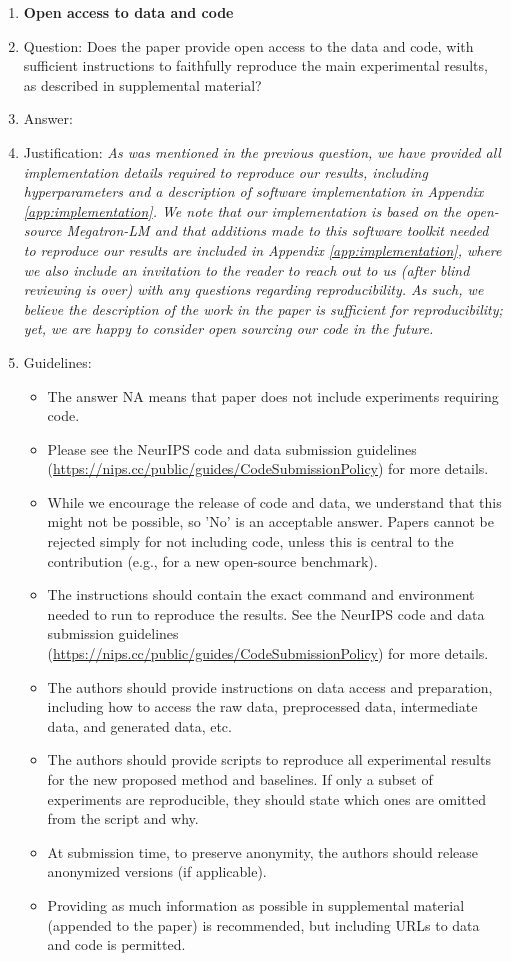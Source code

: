 \documentclass{article}
\theoremstyle{plain}
\begin{document}
\begin{enumerate}
\item {\bf Open access to data and code}
    \item[] Question: Does the paper provide open access to the data and code, with sufficient instructions to faithfully reproduce the main experimental results, as described in supplemental material?
    \item[] Answer: \answerNo %
    \item[] Justification: \textit{As was mentioned in the previous question, we have provided all implementation details required to reproduce our results, including hyperparameters and a description of software implementation in Appendix \ref{app:implementation}. We note that our implementation is based on the open-source Megatron-LM \cite{shoeybi2020megatronlm} and that additions made to this software toolkit needed to reproduce our results are included in Appendix \ref{app:implementation}, where we also include an invitation to the reader to reach out to us (after blind reviewing is over) with any questions regarding reproducibility. As such, we believe the description of the work in the paper is sufficient for reproducibility; yet, we are happy to consider open sourcing our code in the future.}
    \item[] Guidelines:
    \begin{itemize}
        \item The answer NA means that paper does not include experiments requiring code.
        \item Please see the NeurIPS code and data submission guidelines (\url{https://nips.cc/public/guides/CodeSubmissionPolicy}) for more details.
        \item While we encourage the release of code and data, we understand that this might not be possible, so 'No' is an acceptable answer. Papers cannot be rejected simply for not including code, unless this is central to the contribution (e.g., for a new open-source benchmark).
        \item The instructions should contain the exact command and environment needed to run to reproduce the results. See the NeurIPS code and data submission guidelines (\url{https://nips.cc/public/guides/CodeSubmissionPolicy}) for more details.
        \item The authors should provide instructions on data access and preparation, including how to access the raw data, preprocessed data, intermediate data, and generated data, etc.
        \item The authors should provide scripts to reproduce all experimental results for the new proposed method and baselines. If only a subset of experiments are reproducible, they should state which ones are omitted from the script and why.
        \item At submission time, to preserve anonymity, the authors should release anonymized versions (if applicable).
        \item Providing as much information as possible in supplemental material (appended to the paper) is recommended, but including URLs to data and code is permitted.
    \end{itemize}



\end{enumerate}
\end{document}
